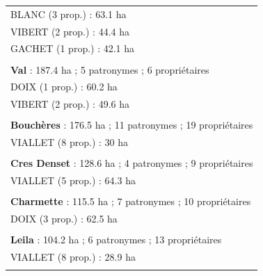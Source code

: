 \begin{tabular}{l}
\addlinespace
\hspace{1em}BLANC (3 prop.) : 63.1 ha\\
\hspace{1em}VIBERT (2 prop.) : 44.4 ha\\
\hspace{1em}GACHET (1 prop.) : 42.1 ha\\
\\
\textbf{Val} : 187.4 ha ; 5 patronymes ; 6 propriétaires\\
\addlinespace
\hspace{1em}DOIX (1 prop.) : 60.2 ha\\
\hspace{1em}VIBERT (2 prop.) : 49.6 ha\\
\\
\textbf{Bouchères} : 176.5 ha ; 11 patronymes ; 19 propriétaires\\
\hspace{1em}VIALLET (8 prop.) : 30 ha\\
\addlinespace
\\
\textbf{Cres Denset} : 128.6 ha ; 4 patronymes ; 9 propriétaires\\
\hspace{1em}VIALLET (5 prop.) : 64.3 ha\\
\\
\textbf{Charmette} : 115.5 ha ; 7 patronymes ; 10 propriétaires\\
\addlinespace
\hspace{1em}DOIX (3 prop.) : 62.5 ha\\
\\
\textbf{Leila} : 104.2 ha ; 6 patronymes ; 13 propriétaires\\
\hspace{1em}VIALLET (8 prop.) : 28.9 ha\\
\\
\bottomrule
\end{tabular}
